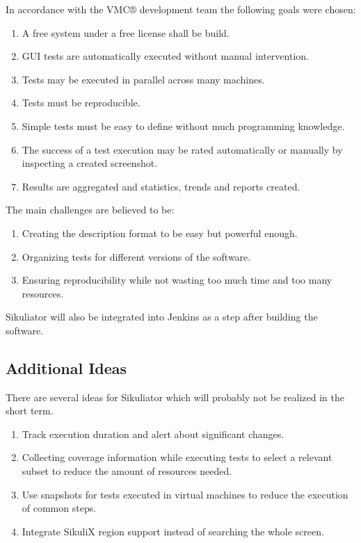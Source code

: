 \documentclass[a4paper,twocolumn]{article}
\newcommand{\VMC}[0]{VMC®}
\newcommand{\Sik}[0]{Sikuliator}
\begin{document}
In accordance with the \VMC{}  development team the following goals were chosen:
\begin{enumerate}
	\item A free system under a free license shall be build.
	\item GUI tests are automatically executed without manual intervention.
	\item Tests may be executed in parallel across many machines.
	\item Tests must be reproducible.
	\item Simple tests must be easy to define without much programming knowledge.
	\item The success of a test execution may be rated automatically or manually by inspecting a created screenshot.
	\item Results are aggregated and statistics, trends and reports created.
\end{enumerate}

The main challenges are believed to be:
\begin{enumerate}
	\item Creating the description format to be easy but powerful enough.
	\item Organizing tests for different versions of the software.
	\item Ensuring reproducibility while not wasting too much time and too many resources.
\end{enumerate}


\Sik{} will also be integrated into Jenkins\cite{Jenkins} as a step after building the software.

\subsection{Additional Ideas}
There are several ideas for \Sik{} which will probably not be realized in the short term.
\begin{enumerate}
	\item Track execution duration and alert about significant changes.
	\item Collecting coverage information while executing tests to select a relevant subset to reduce the amount of resources needed.
	\item Use snapshots for tests executed in virtual machines to reduce the execution of common steps.
	\item Integrate SikuliX region support instead of searching the whole screen.
\end{enumerate}
\end{document}

